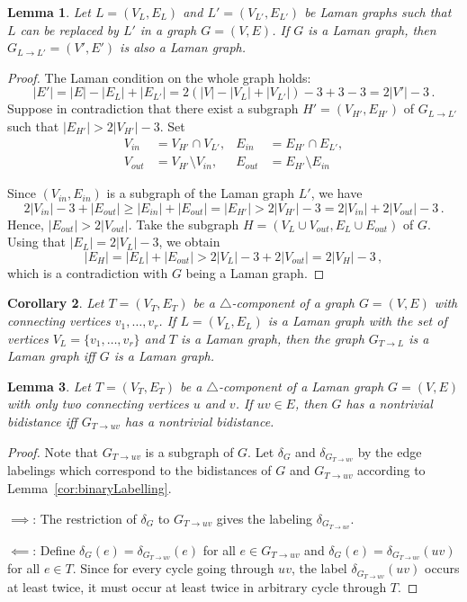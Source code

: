 \documentclass[a4paper, 11pt]{article}
\newcommand{\trcomp}{$\triangle$-component}
\newtheorem{lem}{Lemma}[section]
\newtheorem{cor}[lem]{Corollary}
\theoremstyle{definition}
\begin{document}
\begin{lem}
Let $L=(V_L, E_L)$ and $L'=(V_{L'}, E_{L'})$ be Laman graphs such that $L$ can be replaced by $L'$ in a graph $G=(V,E)$. If $G$ is a Laman graph, then $G_{L\rightarrow L'}=(V',E')$ is also a Laman graph. 
\end{lem}
\begin{proof}
The Laman condition on the whole graph holds:
$$
|E'|=|E|- |E_{L}|+ |E_{L'}|=2(|V|- |V_{L}|+ |V_{L'}|)-3+3-3=2|V'|-3\,.
$$
Suppose in contradiction that there exist a subgraph ${H'}=(V_{H'},E_{H'})$ of $G_{L\rightarrow L'}$ such that $|E_{H'}|> 2|V_{H'}|-3$. Set 
\begin{align*}
 V_{in}&=V_{H'}\cap V_{L'}, &E_{in}&=E_{H'}\cap E_{L'}, \\
 V_{out}&=V_{H'} \setminus V_{in}, & E_{out}&=E_{H'} \setminus E_{in}
\end{align*}

Since $(V_{in}, E_{in})$ is a subgraph of the Laman graph $L'$, we have
$$
2|V_{in}|-3 +|E_{out}|\geq  |E_{in}|+|E_{out}|=|E_{H'}|> 2|V_{{H'}}|-3=2|V_{in}|+2|V_{out}|-3\,.
$$
Hence, $|E_{out}|>2|V_{out}|$. Take the subgraph $H=(V_L \cup V_{out}, E_L \cup E_{out})$ of $G$. Using that $|E_L|=2|V_L|-3$, we obtain
$$|E_H|=|E_L|+|E_{out}|>2|V_L|-3+2|V_{out}|=2|V_H|-3\,,$$
which is  a contradiction with $G$ being a  Laman graph.
\end{proof}

\begin{cor}
\label{cor:replaceTrcompByLaman}
Let $T=(V_T,E_T)$ be a \trcomp{} of a graph $G=(V,E)$ with connecting vertices $v_1, \dots, v_r$. If $L=(V_L,E_L)$ is a Laman graph with the set of vertices $V_L=\{v_1, \dots, v_r\}$ and $T$ is a Laman graph, then the graph $G_{T\rightarrow L}$ is a Laman graph iff $G$ is a Laman graph.
\end{cor}

\begin{lem}
\label{lem:trcompToEdge}
Let $T=(V_T,E_T)$ be a \trcomp{} of a Laman graph $G=(V,E)$ with only two connecting vertices $u$ and $v$. If $uv\in E$, then $G$ has a nontrivial bidistance iff $G_{T\rightarrow uv}$ has a nontrivial bidistance.
\end{lem}
\begin{proof}
Note that $G_{T\rightarrow uv}$ is a subgraph of $G$. Let $\delta_G$ and $\delta_{G_{T\rightarrow uv}}$ by the edge labelings which correspond to the bidistances of $G$ and $G_{T\rightarrow uv}$ according to Lemma~\ref{cor:binaryLabelling}.

$\implies$: The restriction of $\delta_G$ to  $G_{T\rightarrow uv}$ gives the labeling $\delta_{G_{T\rightarrow uv}}$.

$\impliedby$: Define $\delta_G(e)=\delta_{G_{T\rightarrow uv}}(e)$ for all $e\in G_{T\rightarrow uv}$ and $\delta_G(e)=\delta_{G_{T\rightarrow uv}}(uv)$ for all $e\in T$. Since for every cycle going through $uv$, the label $\delta_{G_{T\rightarrow uv}}(uv)$ occurs at least twice, it must occur at least twice in arbitrary cycle through $T$.
\end{proof}
\end{document}
